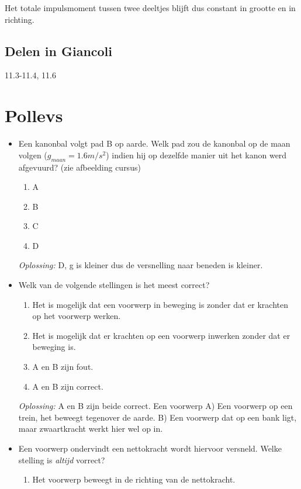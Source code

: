 \documentclass[12pt,a4paper]{article}
\begin{document}
    Het totale impulsmoment tussen twee deeltjes blijft dus constant in grootte en in richting.

    \subsection{Delen in Giancoli}
    11.3-11.4, 11.6
    
    
    \section{Pollevs}
    \begin{itemize}
    \renewcommand\labelitemi{--}
    \item Een kanonbal volgt pad B op aarde. Welk pad zou de kanonbal op de maan volgen (\(g_{maan} = 1.6m/s^2\)) indien hij op dezelfde manier uit het kanon werd afgevuurd? (zie afbeelding cursus)
    \begin{enumerate}
    	[label=\alph*)]
    	\item A
    	\item B
    	\item C
    	\item D
    \end{enumerate}
    \textit{Oplossing:} D, g is kleiner dus de versnelling naar beneden is kleiner.
    \newline
    \item Welk van de volgende stellingen is het meest correct?
    \begin{enumerate}[label=\alph*]
    	\item Het is mogelijk dat een voorwerp in beweging is zonder dat er krachten op het voorwerp werken.
    	\item Het is mogelijk dat er krachten op een voorwerp inwerken zonder dat er beweging is.
    	\item A en B zijn fout.
    	\item A en B zijn correct.
    \end{enumerate}
    \textit{Oplossing:} A en B zijn beide correct. Een voorwerp A) Een voorwerp op een trein, het beweegt tegenover de aarde. B) Een voorwerp dat op een bank ligt, maar zwaartkracht werkt hier wel op in.
    \newline
    \item Een voorwerp ondervindt een nettokracht wordt hiervoor versneld. Welke stelling is \textit{altijd} vorrect?
    \begin{enumerate}[label=\alph*]
    	\item Het voorwerp beweegt in de richting van de nettokracht.

\end{enumerate}
\end{itemize}
\end{document}
